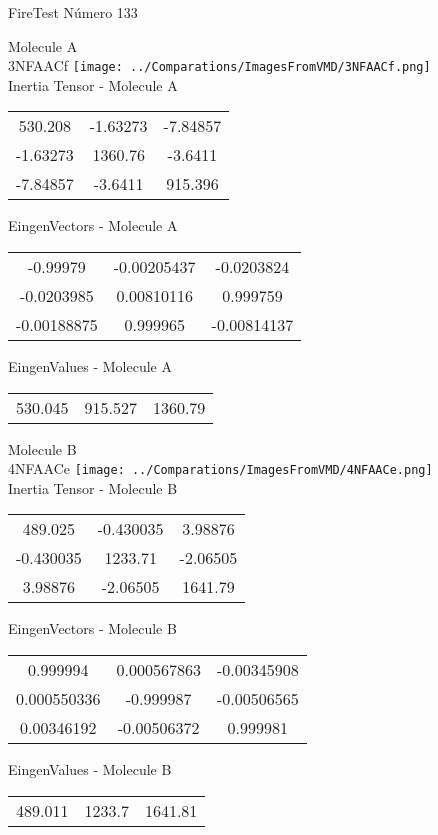 \vtab[-2cm]
\begin{center}
{\large FireTest \tab Número 133}
\end{center}
\begin{multicols}{2}
\begin{center}

Molecule A \\ 
3NFAACf
\texttt{[image: ../Comparations/ImagesFromVMD/3NFAACf.png]}
\\
Inertia Tensor - Molecule A \\
\vtab

\begin{tabular}{|c c c|}
530.208	 & 	-1.63273	 & 	-7.84857	 \\
-1.63273	 & 	1360.76	 & 	-3.6411	 \\
-7.84857	 & 	-3.6411	 & 	915.396
\end{tabular}

\vtab
 EingenVectors - Molecule A     \\
\vtab
\begin{tabular}{|c c c|}
-0.99979	 & 	-0.00205437	 & 	-0.0203824	 \\
-0.0203985	 & 	0.00810116	 & 	0.999759	 \\
-0.00188875	 & 	0.999965	 & 	-0.00814137
\end{tabular}

\vtab
 EingenValues - Molecule A     \\
\vtab
\begin{tabular}{|c c c|}
530.045	 & 	915.527	 & 	1360.79	 \\
\end{tabular}
\columnbreak

Molecule B \\ 
4NFAACe
\texttt{[image: ../Comparations/ImagesFromVMD/4NFAACe.png]}
\\
Inertia Tensor - Molecule B \\
\vtab

\begin{tabular}{|c c c|}
489.025	 & 	-0.430035	 & 	3.98876	 \\
-0.430035	 & 	1233.71	 & 	-2.06505	 \\
3.98876	 & 	-2.06505	 & 	1641.79
\end{tabular}

\vtab
 EingenVectors - Molecule B     \\
\vtab
\begin{tabular}{|c c c|}
0.999994	 & 	0.000567863	 & 	-0.00345908	 \\
0.000550336	 & 	-0.999987	 & 	-0.00506565	 \\
0.00346192	 & 	-0.00506372	 & 	0.999981
\end{tabular}

\vtab
 EingenValues - Molecule B     \\
\vtab
\begin{tabular}{|c c c|}
489.011	 & 	1233.7	 & 	1641.81	 \\
\end{tabular}

\end{center}
\end{multicols}
